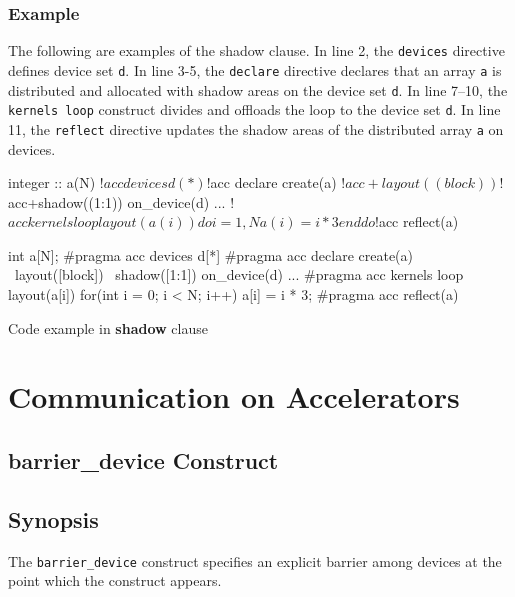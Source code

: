 \subsubsection*{Example}
The following are examples of the shadow clause.
In line 2, the {\tt devices} directive defines device set {\tt d}.
In line 3-5, the {\tt declare} directive declares that an array {\tt a} is distributed and allocated with shadow areas on the device set {\tt d}.
In line 7--10, the {\tt kernels loop} construct divides and offloads the loop to the device set {\tt d}.
In line 11, the {\tt reflect} directive updates the shadow areas of the distributed array {\tt a} on devices.
%
\begin{myfigure}
\begin{minipage}{0.47\hsize}
\begin{center}
\begin{XACCFexampleL}
integer :: a(N)
!$acc devices d(*)
!$acc declare create(a)
!$acc+layout((block))
!$acc+shadow((1:1)) on_device(d)
...
!$acc kernels loop layout(a(i))
do i = 1, N
  a(i) = i * 3
end do
!$acc reflect(a)
\end{XACCFexampleL}
\end{center}
\end{minipage}
%
\begin{minipage}{0.48\hsize}
\begin{center}
\begin{XACCCexampleR}
int a[N];
#pragma acc devices d[*]
#pragma acc declare create(a) \
        layout([block]) \
        shadow([1:1]) on_device(d)
...
#pragma acc kernels loop layout(a[i])
for(int i = 0; i < N; i++){
  a[i] = i * 3;
}
#pragma acc reflect(a)
\end{XACCCexampleR}
\end{center}
\end{minipage}
\caption{Code example in {\XACC} {\bf shadow} clause}\label{code:shadow_clause}
\end{myfigure}


\section{Communication on Accelerators}
\subsection{barrier\_device Construct}
\subsection*{Synopsis}
The {\tt barrier\_device} construct specifies an explicit barrier among devices at the point which the construct appears.

